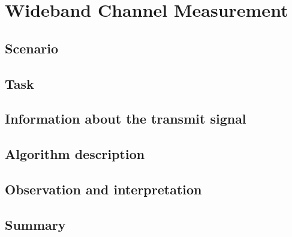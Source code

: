 \chapter{Wideband Channel Measurement}
\section{Scenario}

\section{Task}

\section{Information about the transmit signal}

\section{Algorithm description \cite{e1}}

\section{Observation and interpretation}

\section{Summary}